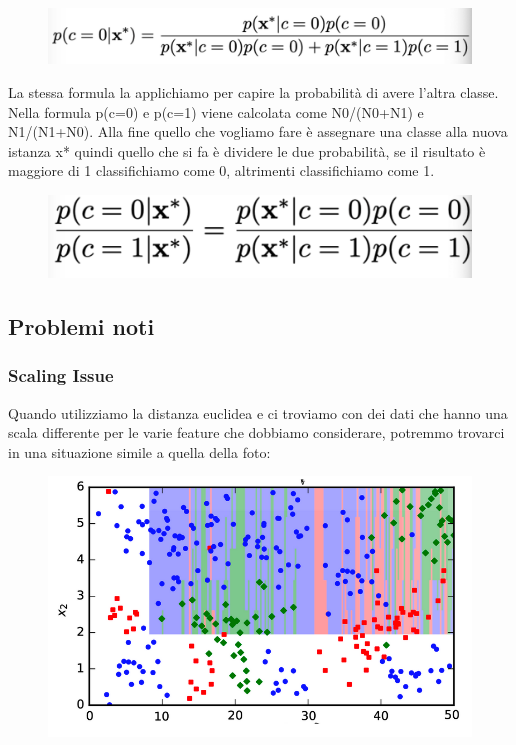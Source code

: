 \documentclass[14pt]{extreport}
\begin{document}
\begin{figure}[H]
	\centering
	\includegraphics[width=0.7\linewidth]{470.jpeg}
\end{figure}

La stessa formula la applichiamo per capire la probabilità di avere l’altra classe. Nella formula p(c=0) e p(c=1) viene calcolata come N0/(N0+N1) e
N1/(N1+N0). Alla fine quello che vogliamo fare è assegnare una classe alla nuova istanza x* quindi quello che si fa è dividere le due probabilità, se
il risultato è maggiore di 1 classifichiamo come 0, altrimenti classifichiamo come 1.


\begin{figure}[H]
	\centering
	\includegraphics[width=0.7\linewidth]{471.jpeg}
\end{figure}


\subsection{Problemi noti}

\subsubsection{Scaling Issue}

Quando utilizziamo la distanza euclidea e ci troviamo con dei dati che hanno una scala differente per le varie feature che dobbiamo considerare,
potremmo trovarci in una situazione simile a quella della foto:

\begin{figure}[H]
	\centering
	\includegraphics[width=0.7\linewidth]{472.jpeg}
\end{figure}
\end{document}
